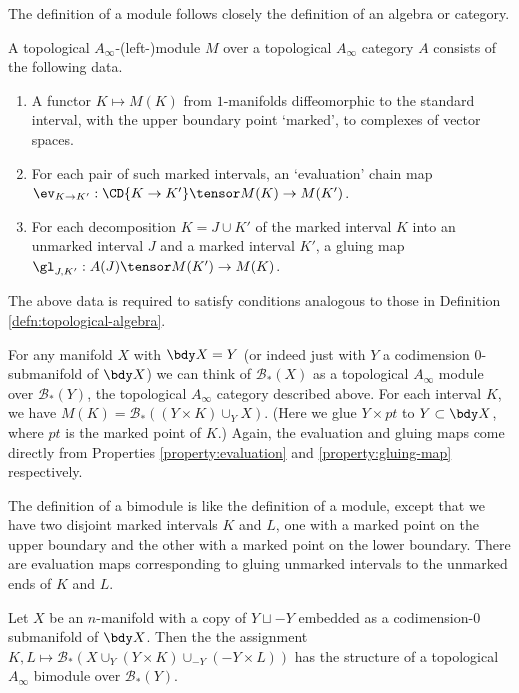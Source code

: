 \documentclass[11pt,leqno]{amsart}
\def\bc{{\mathcal B}}
\def\du{\sqcup}
\begin{document}
The definition of a module follows closely the definition of an algebra or category.
\begin{defn}
\label{defn:topological-module}%
A topological $A_\infty$-(left-)module $M$ over a topological $A_\infty$ category $A$
consists of the following data.
\begin{enumerate}
\item A functor $K \mapsto M(K)$ from $1$-manifolds diffeomorphic to the standard interval, with the upper boundary point `marked', to complexes of vector spaces.
\item For each pair of such marked intervals,
an `evaluation' chain map $\ev_{K\to K'} : \CD{K \to K'} \tensor M(K) \to M(K')$.
\item For each decomposition $K = J\cup K'$ of the marked interval
$K$ into an unmarked interval $J$ and a marked interval $K'$, a gluing map
$\gl_{J,K'} : A(J) \tensor M(K') \to M(K)$.
\end{enumerate}
The above data is required to satisfy
conditions analogous to those in Definition \ref{defn:topological-algebra}.
\end{defn}

For any manifold $X$ with $\bdy X = Y$ (or indeed just with $Y$ a codimension $0$-submanifold of $\bdy X$) we can think of $\bc_*(X)$ as
a topological $A_\infty$ module over $\bc_*(Y)$, the topological $A_\infty$ category described above.
For each interval $K$, we have $M(K) = \bc_*((Y \times K) \cup_Y X)$.
(Here we glue $Y \times pt$ to $Y \subset \bdy X$, where $pt$ is the marked point of $K$.) Again, the evaluation and gluing maps come directly from Properties
\ref{property:evaluation} and \ref{property:gluing-map} respectively.

The definition of a bimodule is like the definition of a module,
except that we have two disjoint marked intervals $K$ and $L$, one with a marked point
on the upper boundary and the other with a marked point on the lower boundary.
There are evaluation maps corresponding to gluing unmarked intervals
to the unmarked ends of $K$ and $L$.

Let $X$ be an $n$-manifold with a copy of $Y \du -Y$ embedded as a
codimension-0 submanifold of $\bdy X$.
Then the the assignment $K,L \mapsto \bc_*(X \cup_Y (Y\times K) \cup_{-Y} (-Y\times L))$ has the
structure of a topological $A_\infty$ bimodule over $\bc_*(Y)$.
\end{document}
